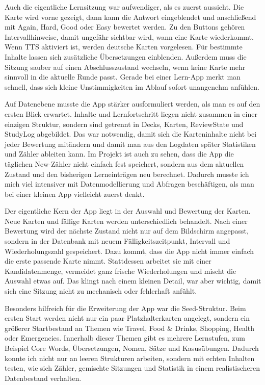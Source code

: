 \documentclass{Vorlage}
\begin{document}
Auch die eigentliche Lernsitzung war aufwendiger, als es zuerst aussieht. Die Karte wird vorne gezeigt, dann kann die Antwort eingeblendet und anschlie\ss{}end mit Again, Hard, Good oder Easy bewertet werden. Zu den Buttons geh\"oren Intervallhinweise, damit ungef\"ahr sichtbar wird, wann eine Karte wiederkommt. Wenn TTS aktiviert ist, werden deutsche Karten vorgelesen. F\"ur bestimmte Inhalte lassen sich zus\"atzliche \"Ubersetzungen einblenden. Au\ss{}erdem muss die Sitzung sauber auf einen Abschlusszustand wechseln, wenn keine Karte mehr sinnvoll in die aktuelle Runde passt. Gerade bei einer Lern-App merkt man schnell, dass sich kleine Unstimmigkeiten im Ablauf sofort unangenehm anf\"uhlen.

Auf Datenebene musste die App st\"arker ausformuliert werden, als man es auf den ersten Blick erwartet. Inhalte und Lernfortschritt liegen nicht zusammen in einer einzigen Struktur, sondern sind getrennt in Decks, Karten, ReviewState und StudyLog abgebildet. Das war notwendig, damit sich die Karteninhalte nicht bei jeder Bewertung mit\"andern und damit man aus den Logdaten sp\"ater Statistiken und Z\"ahler ableiten kann. Im Projekt ist auch zu sehen, dass die App die t\"aglichen New-Z\"ahler nicht einfach fest speichert, sondern aus dem aktuellen Zustand und den bisherigen Lerneintr\"agen neu berechnet. Dadurch musste ich mich viel intensiver mit Datenmodellierung und Abfragen besch\"aftigen, als man bei einer kleinen App vielleicht zuerst denkt.

Der eigentliche Kern der App liegt in der Auswahl und Bewertung der Karten. Neue Karten und f\"allige Karten werden unterschiedlich behandelt. Nach einer Bewertung wird der n\"achste Zustand nicht nur auf dem Bildschirm angepasst, sondern in der Datenbank mit neuem F\"alligkeitszeitpunkt, Intervall und Wiederholungszahl gespeichert. Dazu kommt, dass die App nicht immer einfach die erste passende Karte nimmt. Stattdessen arbeitet sie mit einer Kandidatenmenge, vermeidet ganz frische Wiederholungen und mischt die Auswahl etwas auf. Das klingt nach einem kleinen Detail, war aber wichtig, damit sich eine Sitzung nicht zu mechanisch oder fehlerhaft anf\"uhlt.

Besonders hilfreich f\"ur die Erweiterung der App war die Seed-Struktur. Beim ersten Start werden nicht nur ein paar Platzhalterkarten angelegt, sondern ein gr\"o\ss{}erer Startbestand an Themen wie Travel, Food \& Drinks, Shopping, Health oder Emergencies. Innerhalb dieser Themen gibt es mehrere Lernstufen, zum Beispiel Core Words, \"Ubersetzungen, Nomen, S\"atze und Kasus\"ubungen. Dadurch konnte ich nicht nur an leeren Strukturen arbeiten, sondern mit echten Inhalten testen, wie sich Z\"ahler, gemischte Sitzungen und Statistik in einem realistischeren Datenbestand verhalten.
\end{document}
